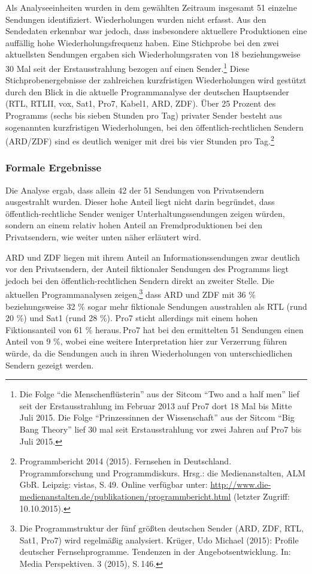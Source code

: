 Als Analyseeinheiten wurden in dem gewählten Zeitraum insgesamt 51
einzelne Sendungen identifiziert. Wiederholungen wurden nicht erfasst.
Aus den Sendedaten erkennbar war jedoch, dass insbesondere aktuellere
Produktionen eine auffällig hohe Wiederholungsfrequenz haben. Eine
Stichprobe bei den zwei aktuellsten Sendungen ergaben sich
Wiederholungsraten von 18 beziehungsweise 30 Mal seit der
Erstausstrahlung bezogen auf einen Sender.\footnote{Die Folge
  \enquote{die Menschenflüsterin} aus der Sitcom \enquote{Two and a half
  men} lief seit der Erstausstrahlung im Februar 2013 auf Pro7 dort 18
  Mal bis Mitte Juli 2015. Die Folge \enquote{Prinzessinnen der
  Wissenschaft} aus der Sitcom \enquote{Big Bang Theory} lief 30 mal
  seit Erstausstrahlung vor zwei Jahren auf Pro7 bis Juli 2015.} Diese
Stichprobenergebnisse der zahlreichen kurzfristigen Wiederholungen wird
gestützt durch den Blick in die aktuelle Programmanalyse der deutschen
Hauptsender (RTL, RTLII, vox, Sat1, Pro7, Kabel1, ARD, ZDF). Über 25
Prozent des Programms (sechs bis sieben Stunden pro Tag) privater Sender
besteht aus sogenannten kurzfristigen Wiederholungen, bei den
öffentlich-rechtlichen Sendern (ARD/ZDF) sind es deutlich weniger mit
drei bis vier Stunden pro Tag.\footnote{Programmbericht 2014 (2015).
  Fernsehen in Deutschland. Programmforschung und Programmdiskurs.
  Hrsg.: die Medienanstalten, ALM GbR. Leipzig: vistas, S.\,49. Online
  verfügbar unter:
  \url{http://www.die-medienanstalten.de/publikationen/programmbericht.html}
  (letzter Zugriff: 10.10.2015).}

\subsubsection{Formale Ergebnisse}\label{formale-ergebnisse}

Die Analyse ergab, dass allein 42 der 51 Sendungen von Privatsendern
ausgestrahlt wurden. Dieser hohe Anteil liegt nicht darin begründet,
dass öffentlich-rechtliche Sender weniger Unterhaltungssendungen zeigen
würden, sondern an einem relativ hohen Anteil an Fremdproduktionen bei
den Privatsendern, wie weiter unten näher erläutert wird.

ARD und ZDF liegen mit ihrem Anteil an Informationssendungen zwar
deutlich vor den Privatsendern, der Anteil fiktionaler Sendungen des
Programms liegt jedoch bei den öffentlich-rechtlichen Sendern direkt an
zweiter Stelle. Die aktuellen Programmanalysen zeigen,\footnote{Die
  Programmstruktur der fünf größten deutschen Sender (ARD, ZDF, RTL,
  Sat1, Pro7) wird regelmäßig analysiert. Krüger, Udo Michael (2015):
  Profile deutscher Fernsehprogramme. Tendenzen in der
  Angebotsentwicklung. In: Media Perspektiven. 3 (2015), S.\,146.} dass
ARD und ZDF mit 36 \% beziehungsweise 32 \% sogar mehr fiktionale
Sendungen ausstrahlen als RTL (rund 20 \%) und Sat1 (rund 28 \%). Pro7
sticht allerdings mit einem hohen Fiktionsanteil von 61 \% heraus.\,Pro7
hat bei den ermittelten 51 Sendungen einen Anteil von 9 \%, wobei eine
weitere Interpretation hier zur Verzerrung führen würde, da die
Sendungen auch in ihren Wiederholungen von unterschiedlichen Sendern
gezeigt werden.

